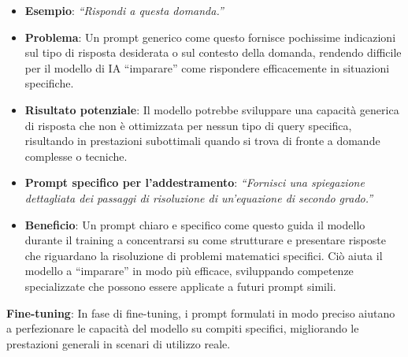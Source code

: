             \begin{itemize}
                \item \textbf{Esempio}: \textit{``Rispondi a questa domanda.''}
                \item \textbf{Problema}: Un prompt generico come questo fornisce pochissime indicazioni sul tipo di risposta desiderata o sul contesto della domanda, rendendo difficile per il modello di IA ``imparare'' come rispondere efficacemente in situazioni specifiche.
                \item \textbf{Risultato potenziale}: Il modello potrebbe sviluppare una capacità generica di risposta che non è ottimizzata per nessun tipo di query specifica, risultando in prestazioni subottimali quando si trova di fronte a domande complesse o tecniche.
                \item \textbf{Prompt specifico per l'addestramento}: \textit{``Fornisci una spiegazione dettagliata dei passaggi di risoluzione di un'equazione di secondo grado.''}
                \item \textbf{Beneficio}: Un prompt chiaro e specifico come questo guida il modello durante il training a concentrarsi su come strutturare e presentare risposte che riguardano la risoluzione di problemi matematici specifici. Ciò aiuta il modello a ``imparare'' in modo più efficace, sviluppando competenze specializzate che possono essere applicate a futuri prompt simili.
            \end{itemize}

            \textbf{Fine-tuning}: In fase di fine-tuning, i prompt formulati in modo preciso aiutano a perfezionare le capacità del modello su compiti specifici, migliorando le prestazioni generali in scenari di utilizzo reale.


